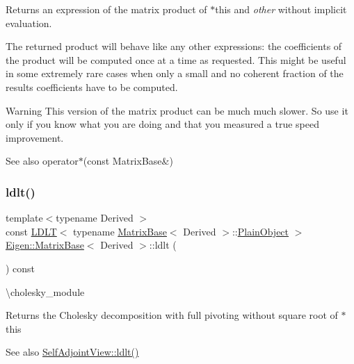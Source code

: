 \begin{DoxyReturn}{Returns}
an expression of the matrix product of {\ttfamily $\ast$this} and {\itshape other} without implicit evaluation.
\end{DoxyReturn}
The returned product will behave like any other expressions\+: the coefficients of the product will be computed once at a time as requested. This might be useful in some extremely rare cases when only a small and no coherent fraction of the result\textquotesingle{}s coefficients have to be computed.

\begin{DoxyWarning}{Warning}
This version of the matrix product can be much much slower. So use it only if you know what you are doing and that you measured a true speed improvement.
\end{DoxyWarning}
\begin{DoxySeeAlso}{See also}
operator$\ast$(const Matrix\+Base\&) 
\end{DoxySeeAlso}
\mbox{\label{class_eigen_1_1_matrix_base_a0ecf058a0727a4cab8b42d79e95072e1}} 
\subsubsection{\texorpdfstring{ldlt()}{ldlt()}}
{\footnotesize\ttfamily template$<$typename Derived $>$ \\
const \mbox{\hyperlink{class_eigen_1_1_l_d_l_t}{L\+D\+LT}}$<$ typename \mbox{\hyperlink{class_eigen_1_1_matrix_base}{Matrix\+Base}}$<$ Derived $>$\+::\mbox{\hyperlink{class_eigen_1_1_dense_base_aae45af9b5aca5a9caae98fd201f47cc4}{Plain\+Object}} $>$ \mbox{\hyperlink{class_eigen_1_1_matrix_base}{Eigen\+::\+Matrix\+Base}}$<$ Derived $>$\+::ldlt (\begin{DoxyParamCaption}{ }\end{DoxyParamCaption}) const\hspace{0.3cm}{\ttfamily [inline]}}

\textbackslash{}cholesky\+\_\+module \begin{DoxyReturn}{Returns}
the Cholesky decomposition with full pivoting without square root of {\ttfamily $\ast$this} 
\end{DoxyReturn}
\begin{DoxySeeAlso}{See also}
\mbox{\hyperlink{class_eigen_1_1_self_adjoint_view_a644155eef17b37c95d85b9f65bb49ac4}{Self\+Adjoint\+View\+::ldlt()}} 
\end{DoxySeeAlso}
\mbox{\label{class_eigen_1_1_matrix_base_a90c45f7a30265df792d5aeaddead2635}} 

